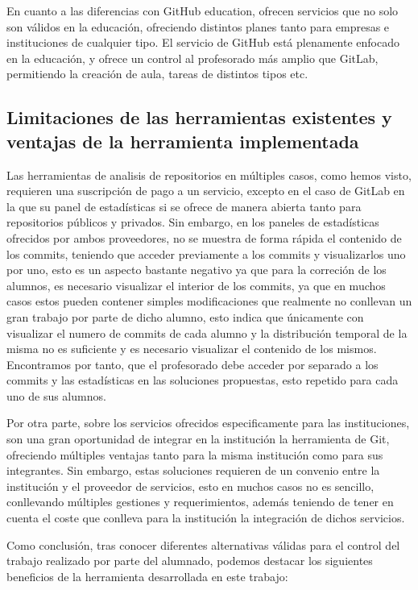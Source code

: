 \begin{itemize}
  En cuanto a las diferencias con GitHub education, ofrecen servicios que
  no solo son válidos en la educación, ofreciendo distintos planes tanto
  para empresas e instituciones de cualquier tipo. El servicio de GitHub
  está plenamente enfocado en la educación, y ofrece un control al
  profesorado más amplio que GitLab, permitiendo la creación de aula,
  tareas de distintos tipos etc.

\end{itemize}


\subsection{Limitaciones de las herramientas existentes y ventajas de la herramienta implementada}

Las herramientas de analisis de repositorios en múltiples casos, como hemos
visto, requieren una suscripción de pago a un servicio, excepto en el caso
de GitLab en la que su panel de estadísticas si se ofrece de manera abierta
tanto para repositorios públicos y privados. Sin embargo, en los paneles de
estadísticas ofrecidos por ambos proveedores, no se muestra de forma rápida
el contenido de los commits, teniendo que acceder previamente a los commits
y visualizarlos uno por uno, esto es un aspecto bastante negativo ya que
para la correción de los alumnos, es necesario visualizar el interior de
los commits, ya que en muchos casos estos pueden contener simples
modificaciones que realmente no conllevan un gran trabajo por parte de
dicho alumno, esto indica que únicamente con visualizar el numero de
commits de cada alumno y la distribución temporal de la misma no es
suficiente y es necesario visualizar el contenido de los mismos.
Encontramos por tanto, que el profesorado debe acceder por separado a los
commits y las estadísticas en las soluciones propuestas, esto repetido para
cada uno de sus alumnos.

Por otra parte, sobre los servicios ofrecidos especificamente para las
instituciones, son una gran oportunidad de integrar en la institución la
herramienta de Git, ofreciendo múltiples ventajas tanto para la misma
institución como para sus integrantes. Sin embargo, estas soluciones
requieren de un convenio entre la institución y el proveedor de servicios,
esto en muchos casos no es sencillo, conllevando múltiples gestiones y
requerimientos, además teniendo de tener en cuenta el coste que conlleva
para la institución la integración de dichos servicios.

Como conclusión, tras conocer diferentes alternativas válidas para el
control del trabajo realizado por parte del alumnado, podemos destacar los
siguientes beneficios de la herramienta desarrollada en este trabajo:

